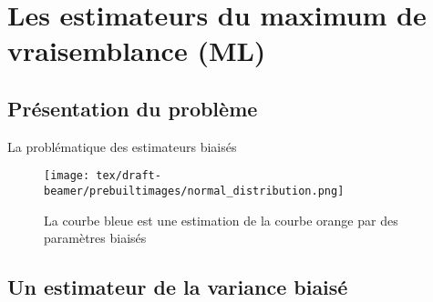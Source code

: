 \documentclass[unknownkeysallowed]{beamer}
\begin{document}
\section{Les estimateurs du maximum de vraisemblance (ML)}
\label{sec:introdcution}

\subsection{Présentation du problème}
\label{sub:un_premier_exemple}

\begin{frame}{La problématique des estimateurs biaisés}

\begin{figure}
    \centering
    \texttt{[image: tex/draft-beamer/prebuiltimages/normal\_distribution.png]}
    \caption{La courbe bleue est une estimation de la courbe orange par des paramètres biaisés}
    \label{fig:my_label}
\end{figure}
    
\end{frame}

\subsection{Un estimateur de la variance biaisé}
\label{sub:deuxiem_exmple}
\end{document}
